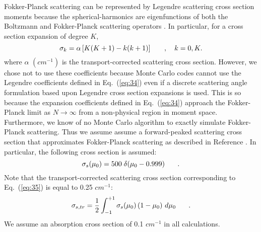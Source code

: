 \documentclass[12pt]{article}
\newcommand{\bracket}[1]{\left[ #1 \right]}
\newcommand{\fn}[1]{\left( #1 \right)}
\newcommand{\be}{\begin{equation}}
\newcommand{\ee}{\end{equation}}
\newcommand{\pec}{\hspace{0.25in},}
\newcommand{\pep}{\hspace{0.25in}.}
\newcommand{\LEQ}[1]{\label{eq:#1}}
\newcommand{\EQ}[1]{Eq.~(\ref{eq:#1})}
\begin{document}
\begin{center}
Fokker-Planck scattering can be represented by Legendre scattering cross section moments because the spherical-harmonics are eigenfunctions 
of both the Boltzmann and Fokker-Planck scattering operators \cite{Morel-FP}. In particular, for a cross section expansion of degree $K$, 
\be
\sigma_k = \alpha \bracket{K(K+1) - k(k+1)} \pec \quad k=0,K. 
\LEQ{34}
\ee
where $\alpha$ $(cm^{-1})$ is the transport-corrected scattering cross section. However, we chose not to use these coefficients 
because  Monte Carlo codes cannot use the Legendre coefficients defined in \EQ{34} even if a discrete scattering 
angle formulation based upon Legendre cross section expansions \cite{BFP} is used.  This is so because the expansion coefficients 
defined in \EQ{34} approach the Fokker-Planck limit as $N \rightarrow \infty$ from a non-physical region in moment space.
Furthermore, we know of no Monte Carlo algorithm to exactly simulate Fokker-Planck scattering.  Thus we assume assume a forward-peaked 
scattering cross section that approximates Fokker-Planck scattering as described in Reference . In particular, the following 
cross section is assumed: 
\be
\sigma_s(\mu_0) = 500 \; \delta(\mu_0 - 0.999) \pep
\LEQ{35}
\ee
Note that the transport-corrected scattering cross section corresponding to \EQ{35} is equal to 0.25 $cm^{-1}$:
\be
\sigma_{s,tr}=\frac{1}{2} \int_{-1}^{+1} \sigma_s(\mu_0)\fn{1-\mu_0} \, d\mu_0 \pep
\LEQ{34a}
\ee
We assume an absorption cross section of 0.1 $cm^{-1}$ in all calculations.



\end{center}
\end{document}
